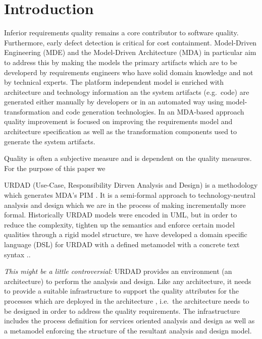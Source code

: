 \section{Introduction}\label{sec:Introduction}

Inferior requirements quality remains a core contributor to software quality\cite{heck_experiences_2008,_strategies_2011}. Furthermore, early defect detection is critical for cost containment\cite{betterRefernceThanBoehm1981WhichReliesOnWaterfall}. Model-Driven Engineering (MDE) and the Model-Driven Architecture (MDA) in particular aim to address this by making the models the primary artifacts which are to be developerd by requirements engineers who have solid domain knowledge and not by technical experts. The platform independent model is enriched with architecture and technology information an the system artifacts (e.g.\ code) are generated either manually by developers or in an automated way using model-transformation and code generation technologies. In an MDA-based approach quality improvement is focused on improving the requirements model and architecture specification as well as the transformation components used to generate the system artifacts.

Quality is often a subjective measure and is dependent on the quality measures. For the purpose of this paper we 

URDAD (Use-Case, Responsibility Dirven Analysis and Design) \cite{solms_technology_2007} is a methodology which generates MDA's PIM \cite{solms_generating_2009}. It is a semi-formal \cite{solms_urdad_2010} approach to technology-neutral analysis and design which we are in the process of making incrementally more formal. Historically URDAD models were encoded in UML, but in order to reduce the complexity, tighten up the semantics and enforce certain model qualities through a rigid model structure, we have developed a domain specific language (DSL) for URDAD with a defined metamodel with a concrete text syntax \cite{solmsfritz_domain-specific_????}..

\emph{This might be a little controversial:} URDAD provides an environment (an architecture) to perform the analysis and design. Like any architecture, it needs to provide a suitable infrastructure to support the quality attributes for the processes which are deployed in the architecture \cite{}, i.e.\ the architecture needs to be designed in order to address the quality requirements. The infrastructure includes the process definition for services oriented analysis and design as well as a metamodel enforcing the structure of the resultant analysis and design model.


